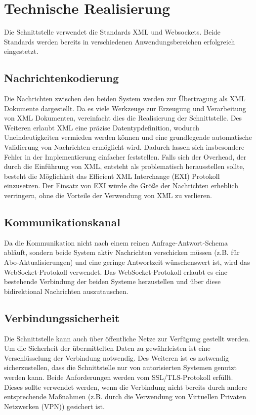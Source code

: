 \chapter{Technische Realisierung}
\label{sec:TechnischeRealisierung}
Die Schnittstelle verwendet die Standards XML und Websockets. Beide Standards werden bereits in verschiedenen Anwendungsbereichen erfolgreich eingestetzt.

\section{Nachrichtenkodierung}
Die Nachrichten zwischen den beiden System werden zur Übertragung als XML Dokumente dargestellt. Da es viele Werkzeuge zur Erzeugung und Verarbeitung von XML Dokumenten, vereinfacht dies die Realisierung der Schnittstelle. Des Weiteren erlaubt XML eine präzise Datentypdefinition, wodurch Uneindeutigkeiten vermieden werden können und eine grundlegende automatische Validierung von Nachrichten ermöglicht wird. Dadurch lassen sich insbesondere Fehler in der Implementierung einfacher feststellen. Falls sich der Overhead, der durch die Einführung von XML, entsteht als problematisch herausstellen sollte, besteht die Möglichkeit das Efficient XML Interchange (EXI) Protokoll einzusetzen. Der Einsatz von EXI würde die Größe der Nachrichten erheblich verringern, ohne die Vorteile der Verwendung von XML zu verlieren.

\section{Kommunikationskanal}
Da die Kommunikation nicht nach einem reinen Anfrage-Antwort-Schema abläuft, sondern beide System aktiv Nachrichten verschicken müssen (z.B. für Abo-Aktualisierungen) und eine geringe Antwortzeit wünschenswert ist, wird das WebSocket-Protokoll verwendet. Das WebSocket-Protokoll erlaubt es eine bestehende Verbindung der beiden Systeme herzustellen und über diese bidirektional Nachrichten auszutauschen.

\section{Verbindungssicherheit}
Die Schnittstelle kann auch über öffentliche Netze zur Verfügung gestellt werden. Um die Sicherheit der übermittelten Daten zu gewährleisten ist eine Verschlüsselung der Verbindung notwendig. Des Weiteren ist es notwendig sicherzustellen, dass die Schnittstelle nur von autorisierten Systemen genutzt werden kann. Beide Anforderungen werden vom SSL/TLS-Protokoll erfüllt. Dieses sollte verwendet werden, wenn die Verbindung nicht bereits durch andere entsprechende Maßnahmen (z.B. durch die Verwendung von Virtuellen Privaten Netzwerken (VPN)) gesichert ist.